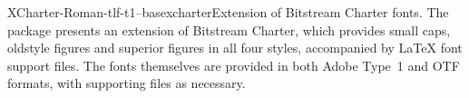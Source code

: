\documentclass{ddltxtyp}
\begin{document}
\begin{package}{XCharter-Roman-tlf-t1--base}{xcharter}{Extension of Bitstream Charter fonts.}
The package presents an extension of Bitstream Charter, which
provides small caps, oldstyle figures and superior figures in
all four styles, accompanied by {\LaTeX} font support files. The
fonts themselves are provided in both Adobe Type~1 and OTF
formats, with supporting files as necessary.
\end{package}

\end{document}
